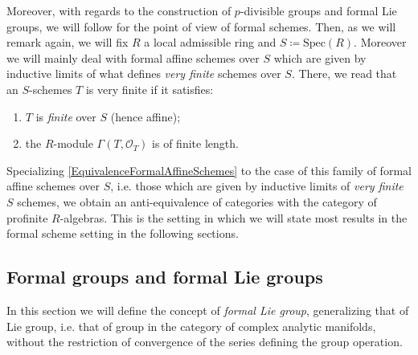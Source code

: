 \documentclass[../Main]{subfiles}
\begin{document}
\begin{rem}[]\label{rem:VeryFiniteSchemes}
	Moreover, with regards to the construction of $p$-divisible groups
	and formal Lie groups, we will follow \cite[\S5]{Shatz} for the point
	of view of formal schemes.
	Then, as we will remark again, we will fix $R$ a 
	local admissible ring and $S \coloneqq \mathrm{Spec}(R)$.
	Moreover we will mainly deal with formal affine schemes over $S$ which
	are given by inductive limits of what \cite{Shatz} defines {\em very finite} schemes over $S$.
	There, we read that an $S$-schemes $T$ is very finite if it satisfies:
	\begin{enumerate}
		\item $T$ is {\em finite} over $S$ (hence affine);
		\item the $R$-module $\Gamma \left( T , \mathcal{O}_{ T } \right)$
			is of finite length.
	\end{enumerate}
	Specializing \cref{EquivalenceFormalAffineSchemes} to the case of
	this family of formal affine schemes over $S$, i.e. those
	which are given by inductive limits of {\em very finite} $S$ schemes,
	we obtain an anti-equivalence of categories with the category of
	profinite $R$-algebras.
	This is the setting in which we will state most results in the 
	formal scheme setting in the following sections.
\end{rem}





\subsection{Formal groups and formal Lie groups}
In this section we will define the concept of {\em formal Lie group},
generalizing that of Lie group, i.e. that of group in the category of
complex analytic manifolds, without the restriction of convergence
of the series defining the group operation.
\end{document}

